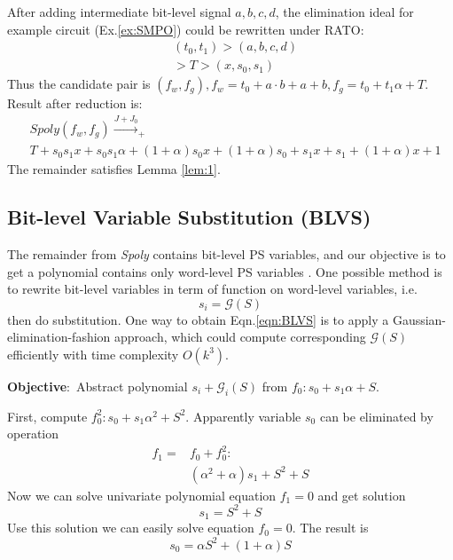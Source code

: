 \begin{Example}
After adding intermediate bit-level signal $a,b,c,d$, the elimination ideal for example circuit (Ex.\ref{ex:SMPO}) 
could be rewritten under RATO:
\begin{align}
&(t_0,t_1)>(a,b,c,d)\nonumber\\&>T>(x,s_0,s_1)\nonumber
\end{align}
Thus the candidate pair is
$(f_w,f_g), f_w = t_0+a\cdot b+a+b, f_g =t_0+t_1\alpha + T$.
Result after reduction is:
\begin{align}
&Spoly(f_w,f_g) \xrightarrow{J+J_0}_{+}\nonumber\\
&T + s_0 s_1 x+s_0 s_1 \alpha+(1+\alpha)s_0 x+(1+\alpha) s_0+s_1 x+s_1+(1+\alpha) x+1\nonumber
\end{align}
The remainder satisfies Lemma \ref{lem:1}.
\end{Example}

\subsection{Bit-level Variable Substitution (BLVS)}
\label{sec:blvs}
The remainder from \emph{Spoly} contains bit-level PS variables, and our objective is to get a polynomial contains only word-level PS variables
. One possible method is to rewrite bit-level variables in term of function on word-level
variables, i.e.
\begin{equation}
\label{eqn:BLVS}
s_i = \mathcal{G}(S)
\end{equation}
then do substitution. One way to obtain Eqn.\ref{eqn:BLVS} is to apply a Gaussian-elimination-fashion approach, which could 
compute corresponding $\mathcal{G}(S)$ efficiently with time complexity $O(k^3)$.

\begin{Example}
{\bf Objective}:\ Abstract polynomial $s_i + \mathcal{G}_i(S)$ from $f_0: s_0+s_1\alpha+S$.

First, compute $f_0^2: s_0+s_1\alpha^2+S^2$. Apparently variable $s_0$ can be
eliminated by operation 
\begin{align}
f_1 =& f_0 + f_0^2: \nonumber\\
&(\alpha^2+\alpha)s_1+S^2+S\nonumber
\end{align}
Now we can solve univariate polynomial equation $f_1 = 0$ and get solution
$$s_1 = S^2 + S$$
Use this solution we can easily solve equation $f_0 = 0$. The result is
$$s_0 = \alpha S^2+(1+\alpha)S$$
\end{Example}

